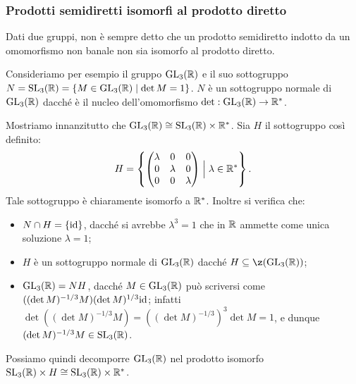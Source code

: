 \documentclass[11pt]{scrartcl}
\begin{document}
	\subsubsection{Prodotti semidiretti isomorfi al prodotto diretto}
	
	Dati due gruppi, non è sempre detto che un prodotto semidiretto indotto da un omomorfismo
	non banale non sia isomorfo al prodotto diretto. \medskip
	
	
	Consideriamo per esempio il gruppo $\operatorname{GL}_3(\mathbb R)$ e il suo sottogruppo $N = \operatorname{SL}_3(\mathbb R) = \{M \in \operatorname{GL}_3(\mathbb R)
	\mid \det M = 1\}$. $N$ è un sottogruppo normale di $\operatorname{GL}_3(\mathbb R)$ dacché è il nucleo
	dell'omomorfismo $\det : \operatorname{GL}_3(\mathbb R) \to \mathbb R^*$. \medskip
	

	Mostriamo innanzitutto che $\operatorname{GL}_3(\mathbb R) \cong \operatorname{SL}_3(\mathbb R) \times \mathbb R^*$. Sia
	$H$ il sottogruppo così definito:
	\[
	H = \left\{\begin{pmatrix}
		\lambda & 0 & 0\\
		0 & \lambda & 0\\
		0 & 0 & \lambda
	\end{pmatrix}\Bigm| \lambda \in \mathbb R^* \right\}.
	\]
	Tale sottogruppo è chiaramente isomorfo a $\mathbb R^*$. Inoltre si verifica che:
	
	\begin{itemize}
		\item $N \cap H = \{\mathrm{id}\}$, dacché si avrebbe $\lambda^3 = 1$ che in $\mathbb R$
		ammette come unica soluzione $\lambda = 1$;
		\item $H$ è un sottogruppo normale di $\operatorname{GL}_3(\mathbb R)$ dacché $H \subseteq \z(\GL_3(\RR))$;
		\item $\operatorname{GL}_3(\mathbb R) = NH$, dacché $M \in \operatorname{GL}_3(\mathbb R)$ può scriversi come
		$((\det M)^{-1/3} M) (\det M)^{1/3} \mathrm{id}$; infatti
		$\det ((\det M)^{-1/3} M) = ((\det M)^{-1/3})^3 \det M = 1$, e dunque
		$(\det M)^{-1/3} M \in \operatorname{SL}_3(\mathbb R)$.
	\end{itemize}
	
	Possiamo quindi decomporre $\operatorname{GL}_3(\mathbb R)$ nel prodotto isomorfo $\operatorname{SL}_3(\mathbb R) \times H \cong \operatorname{SL}_3(\mathbb R) \times \mathbb R^*$. \medskip
\end{document}
